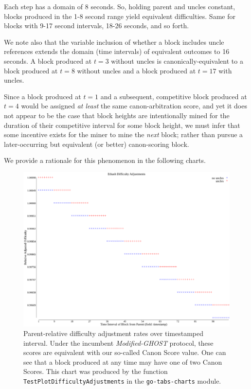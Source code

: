 \documentclass[11pt]{article}
\theoremstyle{plain}
\newcommand{\mghost}{\textit{Modified-GHOST }}
\begin{document}
{Each step has a domain of 8 seconds.
So, holding parent and uncles constant, blocks produced in the 1-8 second range yield equivalent difficulties.
Same for blocks with 9-17 second intervals, 18-26 seconds, and so forth.

We note also that the variable inclusion of whether a block includes uncle references
extends the domain (time intervals) of equivalent outcomes to 16 seconds.
    A block produced at $t=3$ without uncles is canonically-equivalent to
    a block produced at $t=8$ without uncles and
    a block produced at $t=17$ with uncles.

Since a block produced at $t=1$ and a subsequent, competitive block produced at $t=4$ would be assigned
\textit{at least} the same canon-arbitration score, and yet it does not appear to be the case that block heights are intentionally
mined for the duration of their competitive interval for some block height,
we must infer that some incentive exists for the miner to mine the \textit{next} block;
rather than pursue a later-occurring but equivalent (or better) canon-scoring block.

We provide a rationale for this phenomenon in the following charts.


\begin{figure}[tph]
    \centering
    \includegraphics[width=1.0\textwidth]{imgs/vis_ethash_difficulty_adjustment.png}
    \caption{
        Parent-relative difficulty adjustment rates over timestamped interval.
        Under the incumbent \mghost protocol, these scores are equivalent with our so-called Canon Score value.
        One can see that a block produced at any time may have one of two Canon Scores.
        This chart was produced by the function \texttt{TestPlotDifficultyAdjustments} in the \texttt{go-tabs-charts} module.
    }
    \label{fig:vis_ethash_difficulty_adjustment}
\end{figure}

}
\end{document}

